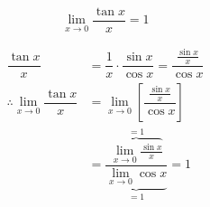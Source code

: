 \documentclass[14pt,fleqn]{extarticle}
\begin{document}
 

\[ \lim_{x\to 0}\dfrac{\tan x}{x} = 1 \]

\newcard 

\begin{align}
\dfrac{\tan x}{x} &= \dfrac{1}{x}\cdot\dfrac{\sin x}{\cos x} = \dfrac{\frac{\sin x}{x}}{\cos x} \\
\therefore \lim_{x\to 0}\dfrac{\tan x}{x} &= \lim_{x\to 0}\left[ \dfrac{\frac{\sin x}{x}}{\cos x}\right] \\
&= \dfrac{\overbrace{\lim_{x\to 0}\frac{\sin x}{x}}^{=1}}{\underbrace{\lim_{x\to 0}\cos x}_{=1}} = 1
\end{align}
\end{document}
